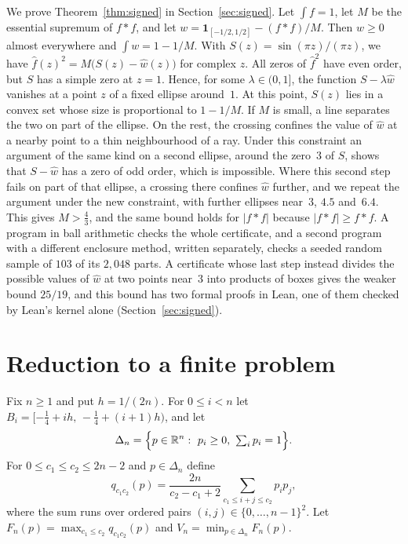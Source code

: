 \documentclass[11pt]{amsart}
\theoremstyle{definition}
\theoremstyle{remark}
\numberwithin{equation}{section}
\newcommand{\R}{\mathbb{R}}
\newcommand{\one}{\mathbf{1}}
\newcommand{\CthrPFrac}{\tfrac43}
\newcommand{\QIndepM}{103}
\newcommand{\LeanSigSlash}{25/19}
\begin{document}
We prove Theorem~\ref{thm:signed} in Section~\ref{sec:signed}. Let $\int f=1$, let $M$ be the essential supremum of $f*f$, and let $w=\one_{[-1/2,1/2]}-(f*f)/M$. Then $w\ge0$ almost everywhere and $\int w=1-1/M$. With $S(z)=\sin(\pi z)/(\pi z)$, we have $\hat f(z)^2=M\bigl(S(z)-\hat w(z)\bigr)$ for complex $z$. All zeros of $\hat f^2$ have even order, but $S$ has a simple zero at $z=1$. Hence, for some $\lambda\in(0,1]$, the function $S-\lambda\hat w$ vanishes at a point $z$ of a fixed ellipse around~$1$. At this point, $S(z)$ lies in a convex set whose size is proportional to $1-1/M$. If $M$ is small, a line separates the two on part of the ellipse. On the rest, the crossing confines the value of $\hat w$ at a nearby point to a thin neighbourhood of a ray. Under this constraint an argument of the same kind on a second ellipse, around the zero~$3$ of $S$, shows that $S-\hat w$ has a zero of odd order, which is impossible. Where this second step fails on part of that ellipse, a crossing there confines $\hat w$ further, and we repeat the argument under the new constraint, with further ellipses near~$3$, $4.5$ and~$6.4$. This gives $M>\CthrPFrac$, and the same bound holds for $|f*f|$ because $|f*f|\ge f*f$. A program in ball arithmetic checks the whole certificate, and a second program with a different enclosure method, written separately, checks a seeded random sample of $\QIndepM$ of its $2{,}048$ parts. A certificate whose last step instead divides the possible values of $\hat w$ at two points near~$3$ into products of boxes gives the weaker bound $\LeanSigSlash$, and this bound has two formal proofs in Lean, one of them checked by Lean's kernel alone (Section~\ref{sec:signed}). 

\section{Reduction to a finite problem}\label{sec:reduction}

Fix $n\ge1$ and put $h=1/(2n)$. For $0\le i<n$ let $B_i=[-\tfrac14+ih,\,-\tfrac14+(i+1)h)$, and let
\[
\Delta_n=\Bigl\{p\in\R^n:\ p_i\ge0,\ \textstyle\sum_i p_i=1\Bigr\}.
\]
For $0\le c_1\le c_2\le 2n-2$ and $p\in\Delta_n$ define
\begin{equation}\label{eq:q}
q_{c_1c_2}(p)=\frac{2n}{c_2-c_1+2}\sum_{c_1\le i+j\le c_2}p_ip_j,
\end{equation}
where the sum runs over ordered pairs $(i,j)\in\{0,\dots,n-1\}^2$. Let $F_n(p)=\max_{c_1\le c_2}q_{c_1c_2}(p)$ and $V_n=\min_{p\in\Delta_n}F_n(p)$.
\end{document}
